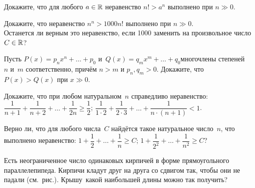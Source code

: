 \documentclass[a4paper,12pt]{article}
\begin{document}
Докажите, что для любого $a\in\mathbb{R}$ неравенство $n!>a^n$ выполнено при $n\gg 0$.

Докажите, что неравенство $n^n>1000n!$ выполнено при $n\gg 0$.\\
Останется ли верным это неравенство, если 1000 заменить на произвольное число $C\in\mathbb{R}$?

Пусть $P(x)=p_n x^n+\ldots+p_0$ и~$Q(x)=q_m x^m+\ldots+q_0$\т многочлены степеней~$n$ и~$m$ соответственно, причём $n>m$ и $p_n,q_m>0$. Докажите, что $P(x)>Q(x)$ при $x\gg 0$.

\vfill
{}
\newpage

Докажите, что при любом натуральном~$n$ справедливо неравенство:\\
$\dfrac1{n+1}+\dfrac1{n+2}+\ldots+\dfrac1{2n}\geqslant\dfrac12$;
$\dfrac1{1\cdot2}+\dfrac1{2\cdot3}+\ldots+\dfrac1{n\cdot(n+1)}<1$.

Верно ли, что для любого числа~$C$ найдётся такое натуральное число~$n$, что выполнено неравенство:
$1+\dfrac12+\ldots+\dfrac1n\geqslant C$;
$1+\dfrac1{2^2}+\ldots+\dfrac1{n^2}\geqslant C$?

\vspace{-6mm}

Есть неограниченное число одинаковых кирпичей в форме прямоугольного параллелепипеда. Кирпичи кладут друг на друга со сдвигом так, чтобы они
не падали (см.~рис.).  Крышу\ какой наибольшей длины можно так получить?\\

\vspace{-6mm}
\end{document}
